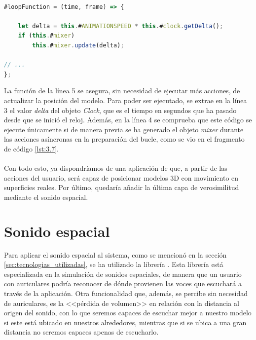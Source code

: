 \documentclass{subfiles}
\begin{document}
\paragraph{}
\begin{lstlisting}[language=JavaScript, caption={Actualización de la posición del modelo 3D antes de renderizar.}, label={lst:3.9}]
#loopFunction = (time, frame) => {

    let delta = this.#ANIMATIONSPEED * this.#clock.getDelta();
    if (this.#mixer)
        this.#mixer.update(delta);

// ...
};
\end{lstlisting}

        La función de la línea 5 se asegura, sin necesidad de ejecutar más acciones, de actualizar la posición del modelo. Para poder ser ejecutado, se extrae en la línea 3 el valor \textit{delta} del objeto \textit{Clock}, que es el tiempo en segundos que ha pasado desde que se inició el reloj. Además, en la línea 4 se comprueba que este código se ejecute únicamente si de manera previa se ha generado el objeto \textit{mixer} durante las acciones asíncronas en la preparación del bucle, como se vio en el fragmento de código \ref{lst:3.7}.
        
        \paragraph{}
        Con todo esto, ya dispondríamos de una aplicación de \ra que, a partir de las acciones del usuario, será capaz de posicionar modelos 3D con movimiento en superficies reales. Por último, quedaría añadir la última capa de verosimilitud mediante el sonido espacial.

        \section{Sonido espacial}
        \label{sec:sonido_espacial}
        Para aplicar el sonido espacial al sistema, como se mencionó en la sección \ref{sec:tecnologias_utilizadas}, se ha utilizado la librería \resonanceaudio \cite{web:resonance_audio}. Esta librería está especializada en la simulación de sonidos espaciales, de manera que un usuario con auriculares podría reconocer de dónde provienen las voces que escuchará a través de la aplicación. Otra funcionalidad que, además, se percibe sin necesidad de auriculares, es la <<pérdida de volumen>> en relación con la distancia al origen del sonido, con lo que seremos capaces de escuchar mejor a nuestro modelo si este está ubicado en nuestros alrededores, mientras que si se ubica a una gran distancia no seremos capaces apenas de escucharlo.
\end{document}
